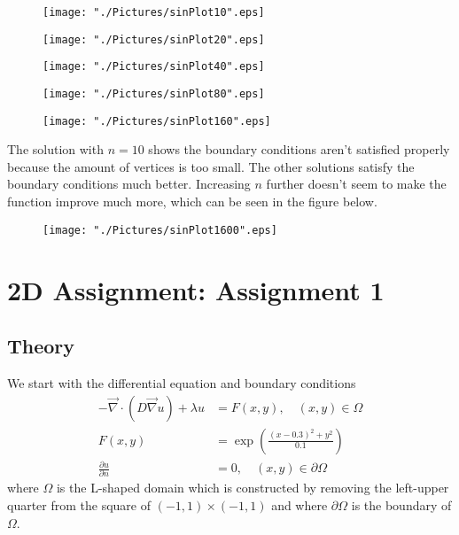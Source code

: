 \documentclass[10pt,a4paper]{article}
\begin{document}
\begin{figure}[H]
	\centering
	\texttt{[image: "./Pictures/sinPlot10".eps]}
\end{figure}
\begin{figure}[H]
	\centering
	\texttt{[image: "./Pictures/sinPlot20".eps]}
\end{figure}
\begin{figure}[H]
	\centering
	\texttt{[image: "./Pictures/sinPlot40".eps]}
\end{figure}
\begin{figure}[H]
	\centering
	\texttt{[image: "./Pictures/sinPlot80".eps]}
\end{figure}
\begin{figure}[H]
	\centering
	\texttt{[image: "./Pictures/sinPlot160".eps]}
\end{figure}

The solution with $n=10$ shows the boundary conditions aren't satisfied properly because the amount of vertices is too small. 
The other solutions satisfy the boundary conditions much better. 
Increasing $n$ further doesn't seem to make the function improve much more, which can be seen in the figure below.
\begin{figure}[H]
	\centering
	\texttt{[image: "./Pictures/sinPlot1600".eps]}
\end{figure}

\newpage
\section{2D Assignment: Assignment 1}
\subsection{Theory}
We start with the differential equation and boundary conditions
\def\div{\vec{\nabla}}
\begin{equation}
\label{eq:diffEq}
\begin{split}
-\div \cdot \left( D \div u \right) + \lambda u &= F(x,y),\quad (x,y) \in \Omega \\
F(x,y) &= \exp{ \left( \frac{(x-0.3)^2 + y^ 2}{0.1} \right) } \\
\frac{\partial u}{\partial n} &= 0, \quad (x,y) \in \partial \Omega
\end{split}
\end{equation}
where $\Omega$ is the L-shaped domain which is constructed by removing the left-upper quarter from the square of $(-1,1) \times (-1,1)$ and where $\partial \Omega$ is the boundary of $\Omega$. 
\end{document}
